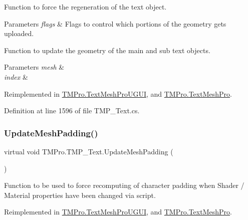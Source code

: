 Function to force the regeneration of the text object. 


\begin{DoxyParams}{Parameters}
{\em flags} & Flags to control which portions of the geometry gets uploaded.\\
\hline
\end{DoxyParams}


Function to update the geometry of the main and sub text objects. 


\begin{DoxyParams}{Parameters}
{\em mesh} & \\
\hline
{\em index} & \\
\hline
\end{DoxyParams}


Reimplemented in \mbox{\hyperlink{class_t_m_pro_1_1_text_mesh_pro_u_g_u_i_a111121630f131c81af75f55f31e392e2}{T\+M\+Pro.\+Text\+Mesh\+Pro\+U\+G\+UI}}, and \mbox{\hyperlink{class_t_m_pro_1_1_text_mesh_pro_a6be3d7406c8db74a978505697704df07}{T\+M\+Pro.\+Text\+Mesh\+Pro}}.



Definition at line 1596 of file T\+M\+P\+\_\+\+Text.\+cs.

\mbox{\label{class_t_m_pro_1_1_t_m_p___text_a874daa5045c407a26694d92f855c0761}} 
\subsubsection{\texorpdfstring{UpdateMeshPadding()}{UpdateMeshPadding()}}
{\footnotesize\ttfamily virtual void T\+M\+Pro.\+T\+M\+P\+\_\+\+Text.\+Update\+Mesh\+Padding (\begin{DoxyParamCaption}{ }\end{DoxyParamCaption})\hspace{0.3cm}{\ttfamily [virtual]}}



Function to be used to force recomputing of character padding when Shader / Material properties have been changed via script. 



Reimplemented in \mbox{\hyperlink{class_t_m_pro_1_1_text_mesh_pro_u_g_u_i_a7a55d8c0461e66d88ab71cd27bea397f}{T\+M\+Pro.\+Text\+Mesh\+Pro\+U\+G\+UI}}, and \mbox{\hyperlink{class_t_m_pro_1_1_text_mesh_pro_a37394f39e8cdc5af63ecfa7286b5bdc3}{T\+M\+Pro.\+Text\+Mesh\+Pro}}.



